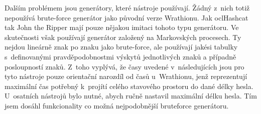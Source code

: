 Dalším problémem jsou generátory, které nástroje používají. Žádný z~nich totiž nepoužívá
 brute-force generátor jako původní verze Wrathionu. Jak oclHashcat tak John the
Ripper mají pouze nějakou imitaci tohoto typu generátoru. Ve skutečnosti však používají generátor
založený na Markovských procesech. Ty nejdou lineárně znak po znaku jako brute-force, ale
používají jakési tabulky s~definovanými pravděpodobnostmi výskytů jednotlivých znaků a případně
posloupností znaků. Z~toho vyplývá, že časy uvedené v~následujících jsou pro tyto nástroje pouze
orientační narozdíl od časů u~Wrathionu, jenž reprezentují maximální čas potřebný k~projítí
celého stavového prostoru do dané délky hesla. U~osatních nástrojů bylo nutné, abych ručně
nastavil maximální délku hesla. Tím jsem dosáhl funkcionality co možná nejpodobnější brute\-force
generátoru.
\shorthandoff{-}
